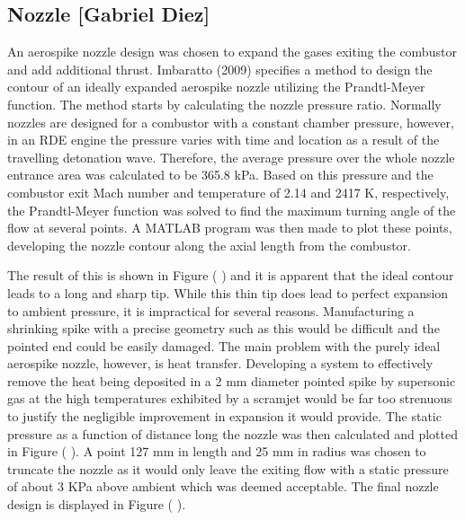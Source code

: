 \subsection{Nozzle [Gabriel Diez]}

An aerospike nozzle design was chosen to expand the gases exiting the combustor and add additional thrust. Imbaratto (2009) specifies a method to design the contour of an ideally expanded aerospike nozzle utilizing the Prandtl-Meyer function. The method starts by calculating the nozzle pressure ratio. Normally nozzles are designed for a combustor with a constant chamber pressure, however, in an RDE engine the pressure varies with time and location as a result of the travelling detonation wave. Therefore, the average pressure over the whole nozzle entrance area was calculated to be 365.8 kPa. Based on this pressure and the combustor exit Mach number and temperature of 2.14 and 2417 K, respectively, the Prandtl-Meyer function was solved to find the maximum turning angle of the flow at several points.   A MATLAB program was then made to plot these points, developing the nozzle contour along the axial length from the combustor.
 
The result of this is shown in Figure ( ) and it is apparent that the ideal contour leads to a long and sharp tip. While this thin tip does lead to perfect expansion to ambient pressure, it is impractical for several reasons. Manufacturing a shrinking spike with a precise geometry such as this would be difficult and the pointed end could be easily damaged. The main problem with the purely ideal aerospike nozzle, however, is heat transfer. Developing a system to effectively remove the heat being deposited in a 2 mm diameter pointed spike by supersonic gas at the high temperatures exhibited by a scramjet would be far too strenuous to justify the negligible improvement in expansion it would provide. The static pressure as a function of distance long the nozzle was then calculated and plotted in Figure ( ). A point 127 mm in length and 25 mm in radius was chosen to truncate the nozzle as it would only leave the exiting flow with a static pressure of about 3 KPa above ambient which was deemed acceptable. The final nozzle design is displayed in Figure ( ).
